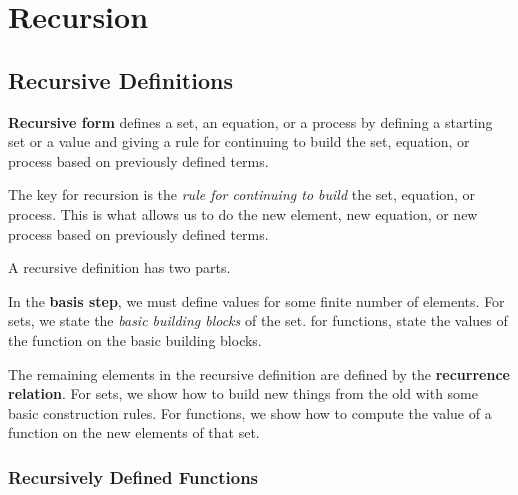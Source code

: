 \chapter{Recursion}

\section{Recursive Definitions}

\begin{defn}
  \textbf{Recursive form} defines a set, an equation, or a process by defining a starting set or a value and giving a rule for continuing to build the set, equation, or process based on previously defined terms.
\end{defn}

The key for recursion is the \emph{rule for continuing to build} the set, equation, or process. This is what allows us to do the new element, new equation, or new process based on previously defined terms.

A recursive definition has two parts.

\begin{defn}
  In the \textbf{basis step}, we must define values for some finite number of
  elements. For sets, we state the \emph{basic building blocks} of the set. for functions, state the values of the function
  on the basic building blocks.
\end{defn}
\begin{defn}
  The remaining elements in the recursive definition are defined by the
  \textbf{recurrence relation}. For sets, we show how
  to build new things from the old with some basic construction rules. For
  functions, we show how to compute the value of a function on the new elements
  of that set.
\end{defn}

\subsection{Recursively Defined Functions}

